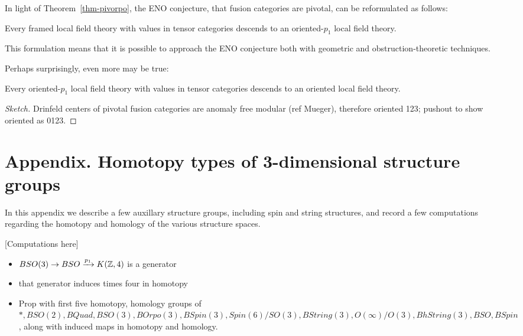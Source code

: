 \documentclass{amsart}
\begin{document}
In light of Theorem~\ref{thm-pivorpo}, the ENO conjecture, that fusion categories are pivotal, can be reformulated as follows:
\begin{conjecture}
Every framed local field theory with values in tensor categories descends to an oriented-$p_1$ local field theory.
\end{conjecture}
This formulation means that it is possible to approach the ENO conjecture both with geometric and obstruction-theoretic techniques.

Perhaps surprisingly, even more may be true:
\begin{conjecture}
Every oriented-$p_1$ local field theory with values in tensor categories descends to an oriented local field theory.
\end{conjecture}

\begin{proof}[Sketch]
Drinfeld centers of pivotal fusion categories are anomaly free modular (ref Mueger), therefore oriented 123; pushout to show oriented as 0123.
\end{proof}



\appendix

\renewcommand{\thetheorem}{A.\arabic{theorem}}
\setcounter{theorem}{0}
\section*{Appendix.  Homotopy types of 3-dimensional structure groups}

In this appendix we describe a few auxillary structure groups, including spin and string structures, and record a few computations regarding the homotopy and homology of the various structure spaces.


[Computations here]
\begin{itemize}
\item $BSO(3) \rightarrow BSO \xrightarrow{p_1} K(\mathbb Z,4)$ is a generator
\item that generator induces times four in homotopy
\item Prop with first five homotopy, homology groups of $*, BSO(2), BQuad, BSO(3), BOrpo(3), BSpin(3), Spin(6)/SO(3), BString(3), O(\infty)/O(3), BhString(3), BSO, BSpin$, along with induced maps in homotopy and homology.
\end{itemize}
\end{document}
